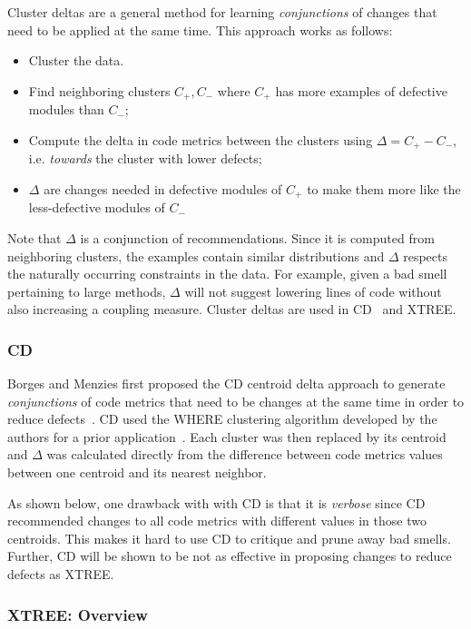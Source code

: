 \documentclass[twocolumn,5p]{elsarticle}
\theoremstyle{break}
\begin{document}
Cluster deltas are a general method
for learning {\em conjunctions} of changes
that need to be applied at the same time. 
This approach works as follows:
\begin{itemize}
    \item Cluster the data. 
    \item Find
neighboring clusters $C_+,C_-$ where $C_+$ has more examples of defective
modules than $C_-$;
\item Compute the  delta   in code metrics between the clusters using \mbox{$\Delta = C_+ - C_-$}, i.e.
{\em towards} the cluster with lower defects;
\item $\Delta$ are changes needed in defective modules of $C_+$ to
      make them more like the less-defective modules of $C_-$
\end{itemize}
Note that $\Delta$ is a conjunction of  recommendations.
Since it is computed
from neighboring clusters, the examples contain similar distributions and $\Delta$ respects the naturally occurring constraints in the data. For example,
given a bad smell pertaining to large methods,   $\Delta$   will not  suggest lowering lines of code
without also increasing a coupling measure. 
Cluster deltas are used in CD~\cite{me12c} and XTREE.



\subsubsection{CD}\label{sec:cdcd}
Borges and Menzies first proposed the CD centroid delta approach to
generate {\em conjunctions} of code metrics
that need to be changes at the same time
in order to reduce defects~\cite{me12c}.
CD used the WHERE clustering algorithm developed by the
authors for a prior application~\cite{localvsglobal}.
Each cluster was then replaced by its centroid
and $\Delta$ was calculated directly from the difference
between code metrics values between one centroid
and its nearest neighbor.


As shown below, one drawback with with CD is that it is {\em verbose}
since
CD   recommended changes to all code
metrics with different values in those two centroids. 
This makes it hard to use CD to   critique and prune away bad smells. Further, CD will be shown to be
not as effective
in proposing changes to reduce defects as XTREE.

\subsubsection{XTREE: Overview}
\end{document}
